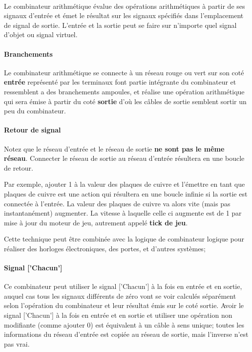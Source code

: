 \documentclass{scrreprt}
\begin{document}
    	
    	\paragraph{}
    	Le combinateur arithmétique évalue des opérations arithmétiques à partir de ses signaux d'entrée et émet le résultat sur les signaux spécifiés dans l'emplacement de signal de sortie. 
    	L'entrée et la sortie peut se faire sur n'importe quel signal d'objet ou signal virtuel.
    	
    	\paragraph{Branchements} 
    	Le combinateur arithmétique se connecte à un réseau rouge ou vert sur son coté \textbf{entrée} représenté par les terminaux font partie intégrante du combinateur et ressemblent a des branchements ampoules, et réalise une opération arithmétique qui sera émise à partir du coté \textbf{sortie} d'où les câbles de sortie semblent sortir un peu du combinateur. 
    	
    	\paragraph{Retour de signal}
    	Notez que le réseau d'entrée et le réseau de sortie \textbf{ne sont pas le même réseau}.
    	Connecter le réseau de sortie au réseau d'entrée résultera en une boucle de retour. 
    	
    	Par exemple, ajouter 1 à la valeur des plaques de cuivre et l'émettre en tant que plaques de cuivre est une action qui résultera en une boucle infinie si la sortie est connectée à l'entrée. 
    	La valeur des plaques de cuivre va alors vite (mais pas instantanément) augmenter. 
    	La vitesse à laquelle celle ci augmente est de 1 par mise à jour du moteur de jeu, autrement appelé \textbf{tick de jeu}. 
    	
    	Cette technique peut être combinée avec la logique de combinateur logique pour réaliser des horloges électroniques, des portes, et d'autres systèmes;
    	
    	\paragraph{Signal ['Chacun']}
    	Ce combinateur peut utiliser le signal ['Chacun'] à la fois en entrée et en sortie, auquel cas tous les signaux différents de zéro vont se voir calculés séparément selon l'opération du combinateur et leur résultat émis sur le coté sortie.
    	Avoir le signal ['Chacun'] à la fois en entrée et en sortie et utiliser une opération non modifiante (comme ajouter 0) est équivalent à un câble à sens unique; toutes les informations du réseau d'entrée est copiée au réseau de sortie, mais l'inverse n'est pas vrai.
    	
\end{document}
